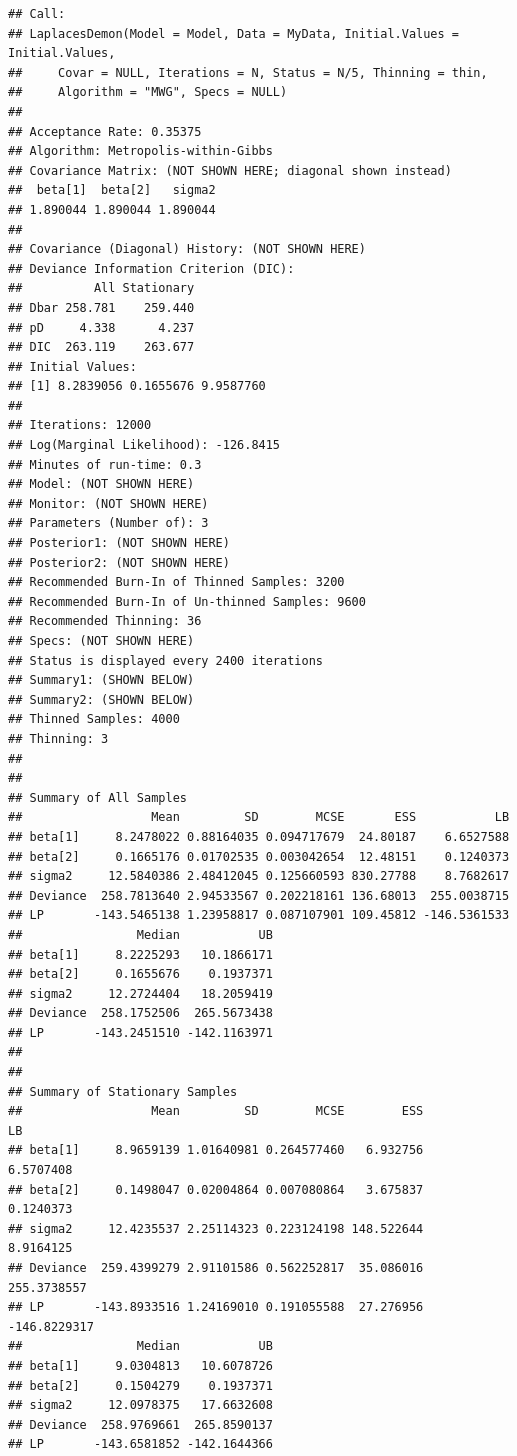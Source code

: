 \documentclass[
]{book}
\begin{document}
\begin{verbatim}
## Call:
## LaplacesDemon(Model = Model, Data = MyData, Initial.Values = Initial.Values, 
##     Covar = NULL, Iterations = N, Status = N/5, Thinning = thin, 
##     Algorithm = "MWG", Specs = NULL)
## 
## Acceptance Rate: 0.35375
## Algorithm: Metropolis-within-Gibbs
## Covariance Matrix: (NOT SHOWN HERE; diagonal shown instead)
##  beta[1]  beta[2]   sigma2 
## 1.890044 1.890044 1.890044 
## 
## Covariance (Diagonal) History: (NOT SHOWN HERE)
## Deviance Information Criterion (DIC):
##          All Stationary
## Dbar 258.781    259.440
## pD     4.338      4.237
## DIC  263.119    263.677
## Initial Values:
## [1] 8.2839056 0.1655676 9.9587760
## 
## Iterations: 12000
## Log(Marginal Likelihood): -126.8415
## Minutes of run-time: 0.3
## Model: (NOT SHOWN HERE)
## Monitor: (NOT SHOWN HERE)
## Parameters (Number of): 3
## Posterior1: (NOT SHOWN HERE)
## Posterior2: (NOT SHOWN HERE)
## Recommended Burn-In of Thinned Samples: 3200
## Recommended Burn-In of Un-thinned Samples: 9600
## Recommended Thinning: 36
## Specs: (NOT SHOWN HERE)
## Status is displayed every 2400 iterations
## Summary1: (SHOWN BELOW)
## Summary2: (SHOWN BELOW)
## Thinned Samples: 4000
## Thinning: 3
## 
## 
## Summary of All Samples
##                  Mean         SD        MCSE       ESS           LB
## beta[1]     8.2478022 0.88164035 0.094717679  24.80187    6.6527588
## beta[2]     0.1665176 0.01702535 0.003042654  12.48151    0.1240373
## sigma2     12.5840386 2.48412045 0.125660593 830.27788    8.7682617
## Deviance  258.7813640 2.94533567 0.202218161 136.68013  255.0038715
## LP       -143.5465138 1.23958817 0.087107901 109.45812 -146.5361533
##                Median           UB
## beta[1]     8.2225293   10.1866171
## beta[2]     0.1655676    0.1937371
## sigma2     12.2724404   18.2059419
## Deviance  258.1752506  265.5673438
## LP       -143.2451510 -142.1163971
## 
## 
## Summary of Stationary Samples
##                  Mean         SD        MCSE        ESS           LB
## beta[1]     8.9659139 1.01640981 0.264577460   6.932756    6.5707408
## beta[2]     0.1498047 0.02004864 0.007080864   3.675837    0.1240373
## sigma2     12.4235537 2.25114323 0.223124198 148.522644    8.9164125
## Deviance  259.4399279 2.91101586 0.562252817  35.086016  255.3738557
## LP       -143.8933516 1.24169010 0.191055588  27.276956 -146.8229317
##                Median           UB
## beta[1]     9.0304813   10.6078726
## beta[2]     0.1504279    0.1937371
## sigma2     12.0978375   17.6632608
## Deviance  258.9769661  265.8590137
## LP       -143.6581852 -142.1644366
\end{verbatim}
\end{document}
